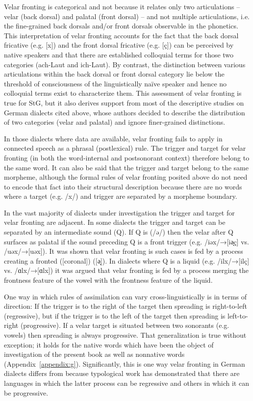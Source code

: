 Velar fronting is categorical and not  because it relates only two articulations -- velar (back dorsal) and palatal (front dorsal) -- and not multiple articulations, i.e. the fine-grained back dorsals and/or front dorsals observable in the phonetics. This interpretation of velar fronting  accounts for the fact that the back dorsal fricative (e.g. [x]) and the front dorsal fricative (e.g. [ç]) can be perceived by native speakers and that there are established colloquial terms for those two categories (ach-Laut and ich-Laut). By contrast, the distinction between various articulations within the back dorsal or front dorsal category lie below the threshold of consciousness of the linguistically naïve speaker and hence no colloquial terms exist to characterize them. This assessment of velar fronting is true for StG, but it also derives support from most of the descriptive studies on German dialects cited above, whose authors decided to describe the distribution of two categories (velar and palatal) and ignore finer-grained distinctions.

In those dialects where data are available, velar fronting fails to apply in connected speech as a phrasal (postlexical) rule. The trigger and target for velar fronting (in both the word-internal and postsonorant context) therefore belong to the same word. It can also be said that the trigger and target belong to the same morpheme, although the formal rules of velar fronting posited above do not need to encode that fact into their structural description because there are no words where a target (e.g. /x/) and trigger are separated by a morpheme boundary.

In the vast majority of dialects under investigation the trigger and target for velar fronting are adjacent. In some dialects the trigger and target can be separated by an intermediate sound (Q). If Q is  (/ə/) then the velar after Q surfaces as palatal if the sound preceding Q is a front trigger (e.g. /iəx/→[iə̟ç] vs. /uəx/→[uəx]). It was shown that velar fronting is such cases is fed by a process creating a fronted ([coronal])  ([ə̟]). In dialects where Q is a liquid (e.g. /ilx/→[ilç] vs. /ɑlx/→[ɑlx]) it was argued that velar fronting is fed by a process merging the frontness feature of the vowel with the frontness feature of the liquid.

One way in which rules of assimilation can vary cross-linguistically is in terms of direction: If the trigger is to the right of the target then spreading is right-to-left (regressive), but if the trigger is to the left of the target then spreading is left-to-right (progressive). If a velar target is situated between two sonorants (e.g. vowels) then spreading is always progressive. That generalization is true without exception; it holds for the native words which have been the object of investigation of the present book as well as nonnative words (Appendix~\ref{appendix:g}). Significantly, this is one way velar fronting in German dialects differs from  because typological work has demonstrated that there are languages in which the latter process can be regressive and others in which it can be progressive.


